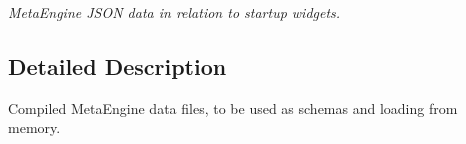 \begin{DoxyCompactItemize}
\begin{DoxyCompactList}\small\item\em Meta\+Engine J\+S\+O\+N data in relation to startup widgets. \end{DoxyCompactList}\end{DoxyCompactItemize}


\subsection{Detailed Description}
Compiled Meta\+Engine data files, to be used as schema\textquotesingle{}s and loading from memory. 